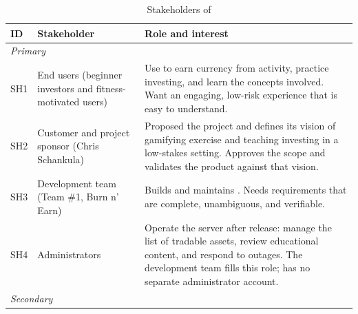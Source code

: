 \documentclass[12pt]{article}
\begin{document}
\begin{table}[H]
  \caption{Stakeholders of \progname{}} \label{TblStakeholders}
  \small
  \begin{tabularx}{\textwidth}{l>{\raggedright\arraybackslash}p{}X}
    \toprule
    \textbf{ID} & \textbf{Stakeholder}                                               & \textbf{Role and interest}                               \\
    \midrule
    \multicolumn{3}{l}{\textit{Primary}}                                                                                                        \\
    \midrule
    SH1         & End users (beginner investors and fitness-motivated users)         & Use
    \progname{} to earn currency from activity, practice investing, and learn the
    concepts involved. Want an engaging, low-risk experience that is easy to
    understand.                                                                                                                                 \\
    SH2         & Customer and project sponsor (Chris Schankula)                     & Proposed the project and
    defines its vision of gamifying exercise and teaching investing in a
    low-stakes setting. Approves the scope and validates the product against that
    vision.                                                                                                                                     \\
    SH3         & Development team (Team \#1, Burn n' Earn)                          & Builds and maintains
    \progname{}. Needs requirements that are complete, unambiguous, and
    verifiable.                                                                                                                                 \\
    SH4         & Administrators                                                     & Operate the server after release: manage the list of
    tradable assets, review educational content, and respond to outages. The
    development team fills this role; \progname{} has no separate administrator
    account.                                                                                                                                    \\
    \midrule
    \multicolumn{3}{l}{\textit{Secondary}}                                                                                                      \\

\end{tabularx}
\end{table}
\end{document}
